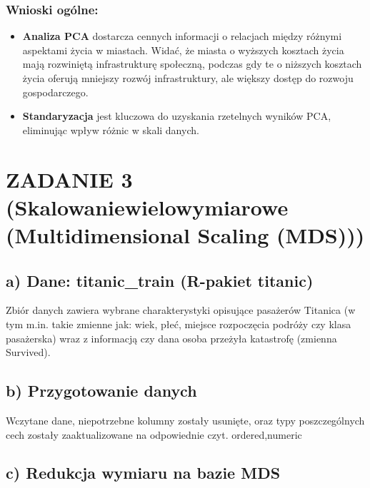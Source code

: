 \documentclass[
  12pt,
]{article}
\providecommand{\tightlist}{%
  \setlength{\itemsep}{0pt}\setlength{\parskip}{0pt}}
\begin{document}
\subsubsection{Wnioski ogólne:}\label{wnioski-oguxf3lne}

\begin{itemize}
\tightlist
\item
  \textbf{Analiza PCA} dostarcza cennych informacji o relacjach między
  różnymi aspektami życia w miastach. Widać, że miasta o wyższych
  kosztach życia mają rozwiniętą infrastrukturę społeczną, podczas gdy
  te o niższych kosztach życia oferują mniejszy rozwój infrastruktury,
  ale większy dostęp do rozwoju gospodarczego.
\item
  \textbf{Standaryzacja} jest kluczowa do uzyskania rzetelnych wyników
  PCA, eliminując wpływ różnic w skali danych.
\end{itemize}

\section{ZADANIE 3 (Skalowaniewielowymiarowe (Multidimensional Scaling
(MDS)))}\label{zadanie-3-skalowaniewielowymiarowe-multidimensional-scaling-mds}

\subsection{a) Dane: titanic\_train (R-pakiet
titanic)}\label{a-dane-titanic_train-r-pakiet-titanic}

Zbiór danych zawiera wybrane charakterystyki opisujące pasażerów
Titanica (w tym m.in. takie zmienne jak: wiek, płeć, miejsce rozpoczęcia
podróży czy klasa pasażerska) wraz z informacją czy dana osoba przeżyła
katastrofę (zmienna Survived).

\subsection{b) Przygotowanie danych}\label{b-przygotowanie-danych}

Wczytane dane, niepotrzebne kolumny zostały usunięte, oraz typy
poszczególnych cech zostały zaaktualizowane na odpowiednie czyt.
ordered,numeric

\subsection{c) Redukcja wymiaru na bazie
MDS}\label{c-redukcja-wymiaru-na-bazie-mds}
\end{document}
